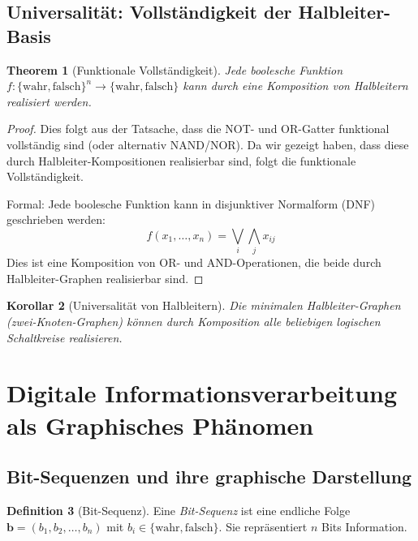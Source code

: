 \documentclass[12pt, a4paper]{article}
\newtheorem{theorem}{Theorem}[section]
\newtheorem{corollary}[theorem]{Korollar}
\theoremstyle{definition}
\newtheorem{definition}[theorem]{Definition}
\theoremstyle{remark}
\newcommand{\Bool}{\{\mathrm{wahr}, \mathrm{falsch}\}}
\begin{document}
\subsection{Universalität: Vollständigkeit der Halbleiter-Basis}
\label{subsec:universalitaet}

\begin{theorem}[Funktionale Vollständigkeit]
\label{thm:funktionale_vollstaendigkeit}
Jede boolesche Funktion $f: \Bool^n \to \Bool$ kann durch eine Komposition von Halbleitern realisiert werden.
\end{theorem}

\begin{proof}
Dies folgt aus der Tatsache, dass die NOT- und OR-Gatter funktional vollständig sind (oder alternativ NAND/NOR). Da wir gezeigt haben, dass diese durch Halbleiter-Kompositionen realisierbar sind, folgt die funktionale Vollständigkeit.

Formal: Jede boolesche Funktion kann in disjunktiver Normalform (DNF) geschrieben werden:
\[
  f(x_1, \ldots, x_n) = \bigvee_{i} \bigwedge_j x_{ij}
\]
Dies ist eine Komposition von OR- und AND-Operationen, die beide durch Halbleiter-Graphen realisierbar sind.
\end{proof}

\begin{corollary}[Universalität von Halbleitern]
Die minimalen Halbleiter-Graphen (zwei-Knoten-Graphen) können durch Komposition alle beliebigen logischen Schaltkreise realisieren.
\end{corollary}

\section{Digitale Informationsverarbeitung als Graphisches Phänomen}
\label{sec:information}

\subsection{Bit-Sequenzen und ihre graphische Darstellung}
\label{subsec:bit_sequenzen}

\begin{definition}[Bit-Sequenz]
\label{def:bit_sequenz}
Eine \emph{Bit-Sequenz} ist eine endliche Folge $\mathbf{b} = (b_1, b_2, \ldots, b_n)$ mit $b_i \in \Bool$. Sie repräsentiert $n$ Bits Information.
\end{definition}
\end{document}
